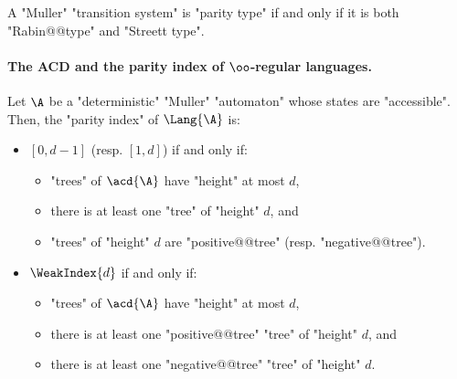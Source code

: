 \documentclass{theoretics}
\begin{document}
\begin{corollary}\label{cor-cor:parityTS-iff-RabinAndStreettTS}
	A "Muller" "transition system" is "parity type" if and only if it is both "Rabin@@type" and "Streett type". 
\end{corollary}


\paragraph*{The ACD and the parity index of $\oo$-regular languages.}
\begin{proposition}\label{prop-typ:parity index-Muller-automaton}
	Let $\A$ be a "deterministic" "Muller" "automaton" whose states are "accessible". Then, the "parity index" of $\Lang{\A}$ is:
	\begin{itemize}
		\item $[0,d-1]$ (resp. $[1,d]$) if and only if:
		\begin{itemize}
			\item "trees" of $\acd{\A}$ have "height" at most $d$, 
			\item there is at least one "tree" of "height" $d$, and
			\item "trees" of "height" $d$ are "positive@@tree" (resp. "negative@@tree").
		\end{itemize} 
		\item $\WeakIndex{d}$ if and only if: 
		\begin{itemize}
			\item "trees" of $\acd{\A}$ have "height" at most $d$, 
			\item there is at least one "positive@@tree" "tree" of "height" $d$, and
			\item there is at least one "negative@@tree" "tree" of "height" $d$.
		\end{itemize} 
	\end{itemize}
\end{proposition}
\end{document}
